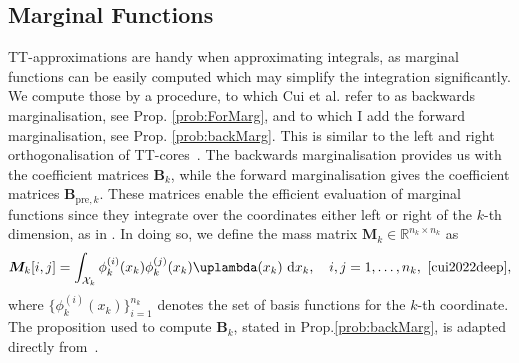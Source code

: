 \subsection{Marginal Functions}
\label{subsec:TTMarg}
TT-approximations are handy when approximating integrals, as marginal functions can be easily computed which may simplify the integration significantly.
We compute those by a procedure, to which Cui et al. \cite{cui2022deep} refer to as backwards marginalisation, see Prop. \ref{prob:ForMarg}, and to which I add the forward marginalisation, see Prop. \ref{prob:backMarg}. 
This is similar to the left and right orthogonalisation of TT-cores~\cite{oseledets2011tensor, Oseledets2011DMRG}.
The backwards marginalisation provides us with the coefficient matrices $\bm{B}_k$, while the forward marginalisation gives the coefficient matrices $\bm{B}_{\text{pre}, k}$. 
These matrices enable the efficient evaluation of marginal functions since they integrate over the coordinates either left or right of the $k$-th dimension, as in \cite{cui2022deep}.
In doing so, we define the mass matrix $\bm{M}_k \in \mathbb{R}^{n_k \times n_k}$ as
\begin{equation}
	\bm{M}_k[i, j] = \int_{\mathcal{X}_k} \phi^{(i)}_k(x_k) \phi^{(j)}_k(x_k) \uplambda(x_k) \, \diff x_k, \quad i, j = 1, \dots, n_k, \, \,  \text{\cite[Eq. 22]{cui2022deep}} \label{eq:MassMat},
\end{equation}
where $\{\phi^{(i)}_k(x_k)\}_{i=1}^{n_k}$ denotes the set of basis functions for the $k$-th coordinate.
The proposition used to compute $\bm{B}_k$, stated in Prop.\ref{prob:backMarg}, is adapted directly from~\cite{cui2022deep}.


